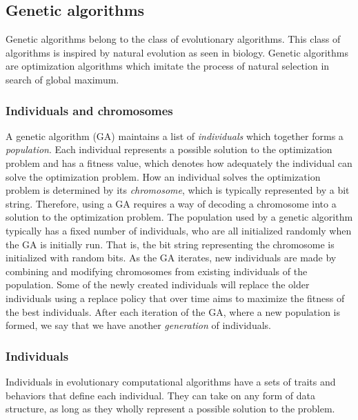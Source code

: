 \subsection{Genetic algorithms}
Genetic algorithms belong to the class of evolutionary algorithms. This class of algorithms is inspired by natural evolution as seen in biology. Genetic algorithms are optimization algorithms which imitate the process of natural selection in search of global maximum.

\subsubsection{Individuals and chromosomes}
A genetic algorithm (GA) maintains a list of \emph{individuals} which together forms a \emph{population}. Each individual represents a possible solution to the optimization problem and has a fitness value, which denotes how adequately the individual can solve the optimization problem. How an individual solves the optimization problem is determined by its \emph{chromosome}, which is typically represented by a bit string. Therefore, using a GA requires a way of decoding a chromosome into a solution to the optimization problem. The population used by a genetic algorithm typically has a fixed number of individuals, who are all initialized randomly when the GA is initially run. That is, the bit string representing the chromosome is initialized with random bits. As the GA iterates, new individuals are made by combining and modifying chromosomes from existing individuals of the population. Some of the newly created individuals will replace the older individuals using a replace policy that over time aims to maximize the fitness of the best individuals. After each iteration of the GA, where a new population is formed, we say that we have another \emph{generation} of individuals.

\subsubsection{Individuals}
Individuals in evolutionary computational algorithms have a sets of traits and behaviors that define each individual. They can take on any form of data structure, as long as they wholly represent a possible solution to the problem. 


